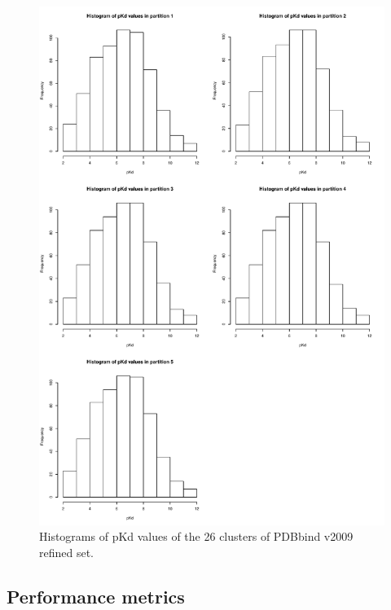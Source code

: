 \begin{figure}
\includegraphics[width=\linewidth]{../rfcyscore/cv.pdf}
\caption{Histograms of pKd values of the 26 clusters of PDBbind v2009 refined set.}
\label{rfcyscore:lcocv}
\end{figure}

\subsection{Performance metrics}

